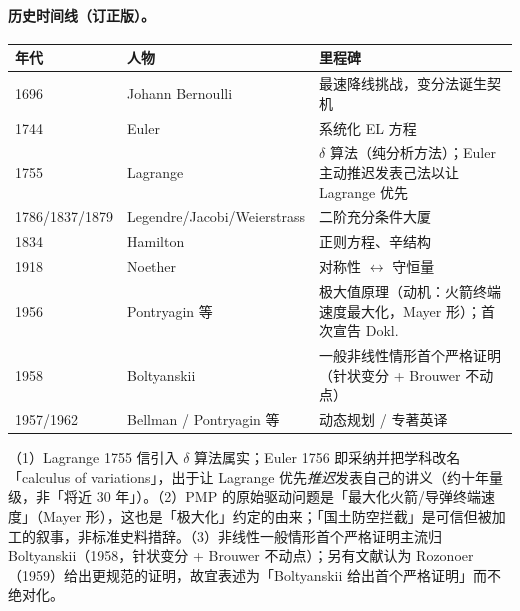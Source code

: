 \paragraph{历史时间线（订正版）。}
\begin{center}\small
\begin{tabular}{lll}
\toprule
年代 & 人物 & 里程碑\\
\midrule
1696 & Johann Bernoulli & 最速降线挑战，变分法诞生契机\\
1744 & Euler & 系统化 EL 方程\\
1755 & Lagrange & $\delta$ 算法（纯分析方法）；Euler 主动推迟发表己法以让 Lagrange 优先\\
1786/1837/1879 & Legendre/Jacobi/Weierstrass & 二阶充分条件大厦\\
1834 & Hamilton & 正则方程、辛结构\\
1918 & Noether & 对称性 $\leftrightarrow$ 守恒量\\
1956 & Pontryagin 等 & 极大值原理（动机：火箭终端速度最大化，Mayer 形）；首次宣告 Dokl.\\
1958 & Boltyanskii & 一般非线性情形首个严格证明（针状变分 + Brouwer 不动点）\\
1957/1962 & Bellman / Pontryagin 等 & 动态规划 / 专著英译\\
\bottomrule
\end{tabular}
\end{center}

\begin{note}[史料订正]
（1）Lagrange 1755 信引入 $\delta$ 算法属实；Euler 1756 即采纳并把学科改名「calculus of variations」，出于让 Lagrange 优先\emph{推迟}发表自己的讲义（约十年量级，非「将近 30 年」）。（2）PMP 的原始驱动问题是「最大化火箭/导弹终端速度」（Mayer 形），这也是「极大化」约定的由来；「国土防空拦截」是可信但被加工的叙事，非标准史料措辞。（3）非线性一般情形首个严格证明主流归 Boltyanskii（1958，针状变分 + Brouwer 不动点）；另有文献认为 Rozonoer（1959）给出更规范的证明，故宜表述为「Boltyanskii 给出首个严格证明」而不绝对化。
\end{note}


